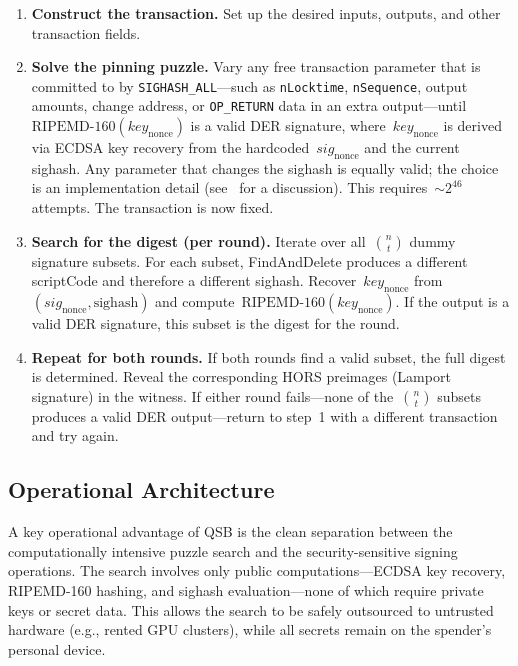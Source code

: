 \documentclass[11pt, a4paper]{article}
\begin{document}
\begin{enumerate}
    \item \textbf{Construct the transaction.} Set up the desired inputs, outputs, and other transaction fields.

    \item \textbf{Solve the pinning puzzle.} Vary any free transaction parameter that is committed to by \texttt{SIGHASH\_ALL}---such as \texttt{nLocktime}, \texttt{nSequence}, output amounts, change address, or \texttt{OP\_RETURN} data in an extra output---until~$\text{RIPEMD-160}(\mathit{key}_{\mathrm{nonce}})$ is a valid DER signature, where~$\mathit{key}_{\mathrm{nonce}}$ is derived via ECDSA key recovery from the hardcoded~$\mathit{sig}_{\mathrm{nonce}}$ and the current sighash. Any parameter that changes the sighash is equally valid; the choice is an implementation detail (see~\cite[Section~5.2]{linus2024binohash} for a discussion). This requires~${\sim}2^{46}$ attempts. The transaction is now fixed.

    \item \textbf{Search for the digest (per round).} Iterate over all~$\binom{n}{t}$ dummy signature subsets. For each subset, FindAndDelete produces a different scriptCode and therefore a different sighash. Recover~$\mathit{key}_{\mathrm{nonce}}$ from~$(\mathit{sig}_{\mathrm{nonce}}, \text{sighash})$ and compute~$\text{RIPEMD-160}(\mathit{key}_{\mathrm{nonce}})$. If the output is a valid DER signature, this subset is the digest for the round.

    \item \textbf{Repeat for both rounds.} If both rounds find a valid subset, the full digest is determined. Reveal the corresponding HORS preimages (Lamport signature) in the witness. If either round fails---none of the~$\binom{n}{t}$ subsets produces a valid DER output---return to step~1 with a different transaction and try again.
\end{enumerate}

\subsection{Operational Architecture}
\label{sec:operational-architecture}

A key operational advantage of QSB is the clean separation between the computationally intensive puzzle search and the security-sensitive signing operations. The search involves only public computations---ECDSA key recovery, RIPEMD-160 hashing, and sighash evaluation---none of which require private keys or secret data. This allows the search to be safely outsourced to untrusted hardware (e.g., rented GPU clusters), while all secrets remain on the spender's personal device.
\end{document}
